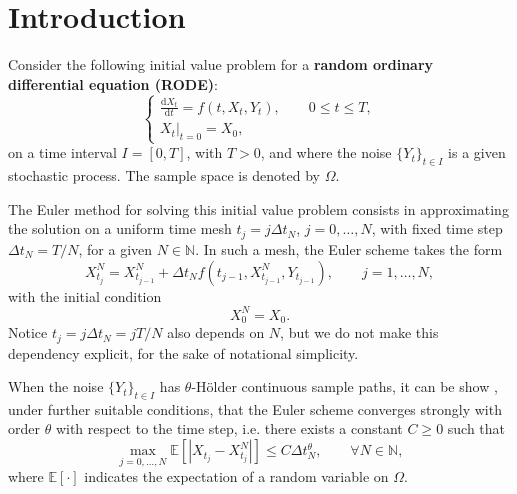 \documentclass[reqno,12pt]{amsart}
\theoremstyle{plain}%
\theoremstyle{definition}
\begin{document}
\maketitle

\section{Introduction}

Consider the following initial value problem for a \textbf{random ordinary differential equation (RODE)}:
\begin{equation}
  \label{rodeeq}
  \begin{cases}
    \displaystyle \frac{\mathrm{d}X_t}{\mathrm{d} t} = f(t, X_t, Y_t), \qquad 0 \leq t \leq T, \\
    \left. X_t \right|_{t = 0} = X_0,
  \end{cases}
\end{equation}
on a time interval $I=[0, T]$, with $T > 0$, and where the noise $\{Y_t\}_{t\in I}$ is a given stochastic process. The sample space is denoted by $\Omega$.

The Euler method for solving this initial value problem consists in approximating the solution on a uniform time mesh $t_j = j\Delta t_N$, $j = 0, \ldots, N$, with fixed time step $\Delta t_N = T/N$, for a given $N\in \mathbb{N}$. In such a mesh, the Euler scheme takes the form
\begin{equation}
  \label{emscheme}
  X_{t_j}^N = X_{t_{j-1}}^N + \Delta t_N f(t_{j-1}, X_{t_{j-1}}^N, Y_{t_{j-1}}), \qquad j = 1, \ldots, N,
\end{equation}
with the initial condition
\begin{equation}
  \label{iccondition}
  X_0^N = X_0.
\end{equation}
Notice $t_j = j\Delta t_N = jT/N$ also depends on $N$, but we do not make this dependency explicit, for the sake of notational simplicity.

When the noise $\{Y_t\}_{t\in I}$ has $\theta$-H\"older continuous sample paths, it can be show \cite{GruneKloeden2001}, under further suitable conditions, that the Euler scheme converges strongly with order $\theta$ with respect to the time step, i.e. there exists a constant $C \geq 0$ such that
\begin{equation}
    \label{strongordertheta}
    \max_{j=0, \ldots, N}\mathbb{E}\left[ \left| X_{t_j} - X_{t_j}^N \right| \right] \leq C \Delta t_N^\theta, \qquad \forall N \in \mathbb{N},
\end{equation}
where $\mathbb{E}[\cdot]$ indicates the expectation of a random variable on $\Omega$.
\end{document}
